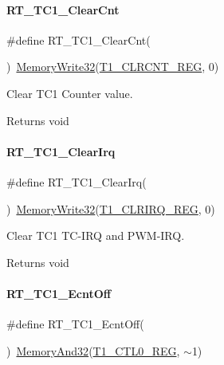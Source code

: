 \paragraph{\texorpdfstring{R\+T\+\_\+\+T\+C1\+\_\+\+Clear\+Cnt}{RT\_TC1\_ClearCnt}}
{\footnotesize\ttfamily \#define R\+T\+\_\+\+T\+C1\+\_\+\+Clear\+Cnt(\begin{DoxyParamCaption}{ }\end{DoxyParamCaption})~\mbox{\hyperlink{a00020_a6b9732365b12e48ddb89fe1028b975b0}{Memory\+Write32}}(\mbox{\hyperlink{a00020_adadaa0ab1ebbd7ba9b70dfd24c3ed44da8d9e7af787d31f28782260c199cc8bd5}{T1\+\_\+\+C\+L\+R\+C\+N\+T\+\_\+\+R\+EG}}, 0)}



Clear T\+C1 Counter value. 

\begin{DoxyReturn}{Returns}
void 
\end{DoxyReturn}
\mbox{\label{a00044_ab9c21242bf3ba2144aa45a336a4dc7ea}} 
\paragraph{\texorpdfstring{R\+T\+\_\+\+T\+C1\+\_\+\+Clear\+Irq}{RT\_TC1\_ClearIrq}}
{\footnotesize\ttfamily \#define R\+T\+\_\+\+T\+C1\+\_\+\+Clear\+Irq(\begin{DoxyParamCaption}{ }\end{DoxyParamCaption})~\mbox{\hyperlink{a00020_a6b9732365b12e48ddb89fe1028b975b0}{Memory\+Write32}}(\mbox{\hyperlink{a00020_adadaa0ab1ebbd7ba9b70dfd24c3ed44daf10911af3fb19f6d248097500d6ab3cd}{T1\+\_\+\+C\+L\+R\+I\+R\+Q\+\_\+\+R\+EG}}, 0)}



Clear T\+C1 T\+C-\/\+I\+RQ and P\+W\+M-\/\+I\+RQ. 

\begin{DoxyReturn}{Returns}
void 
\end{DoxyReturn}
\mbox{\label{a00044_a1c9b9839a03d3e9b1158a2be2feebf42}} 
\paragraph{\texorpdfstring{R\+T\+\_\+\+T\+C1\+\_\+\+Ecnt\+Off}{RT\_TC1\_EcntOff}}
{\footnotesize\ttfamily \#define R\+T\+\_\+\+T\+C1\+\_\+\+Ecnt\+Off(\begin{DoxyParamCaption}{ }\end{DoxyParamCaption})~\mbox{\hyperlink{a00020_ad87cedffcaadc51db22594fce55173d4}{Memory\+And32}}(\mbox{\hyperlink{a00020_adadaa0ab1ebbd7ba9b70dfd24c3ed44da38632250c2e72df96fcaa3f8bd8ecc5e}{T1\+\_\+\+C\+T\+L0\+\_\+\+R\+EG}}, $\sim$1)}



